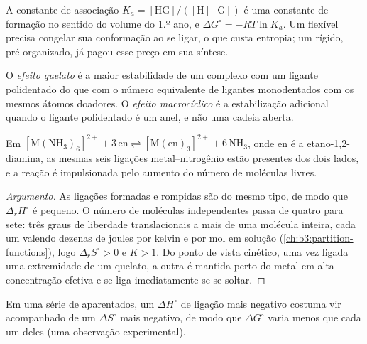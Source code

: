 A constante de associação $K_a = [\mathrm{HG}]/([\mathrm H][\mathrm G])$ é uma constante de formação no sentido do
volume do 1.º ano, e $\Delta G^\circ = -RT\ln K_a$. Um  flexível precisa congelar sua
conformação ao se ligar, o que custa entropia; um  rígido, pré-organizado, já
pagou esse preço em sua síntese.

\begin{definition}\label{def:b3:supramolecular:macrocyclic}
O \emph{efeito quelato} é a maior estabilidade de um
complexo com um ligante polidentado do que com o número equivalente de
ligantes monodentados com os mesmos átomos doadores. O \emph{efeito
macrocíclico} é a estabilização adicional quando o
ligante polidentado é um anel, e não uma cadeia aberta.
\end{definition}

\begin{proposition}\label{prop:b3:supramolecular:chelate-entropy}
Em $\mathrm{[M(NH_3)_6]^{2+} + 3\,en \rightleftharpoons [M(en)_3]^{2+} + 6\,NH_3}$, onde en é a etano-1,2-diamina, as mesmas seis
ligações metal--nitrogênio estão presentes dos dois lados, e a reação é impulsionada pelo
aumento do número de moléculas livres.
\end{proposition}

\begin{proof}[Argumento]
As ligações formadas e rompidas são do mesmo tipo, de modo que $\Delta_rH^\circ$ é pequeno. O número de
moléculas independentes passa de quatro para sete: três graus de liberdade translacionais
a mais de uma molécula inteira, cada um valendo dezenas de joules por kelvin
e por mol em solução (\cref{ch:b3:partition-functions}), logo $\Delta_rS^\circ > 0$ e $K > 1$.
Do ponto de vista cinético, uma vez ligada uma extremidade de um quelato, a outra é mantida perto do
metal em alta concentração efetiva e se liga imediatamente se se soltar.
\end{proof}

\begin{proposition}\label{prop:b3:supramolecular:compensation}
Em uma série de  aparentados, um $\Delta H^\circ$ de ligação mais negativo
costuma vir acompanhado de um $\Delta S^\circ$ mais negativo, de modo que $\Delta G^\circ$ varia menos que cada um deles (uma
observação experimental).
\end{proposition}


